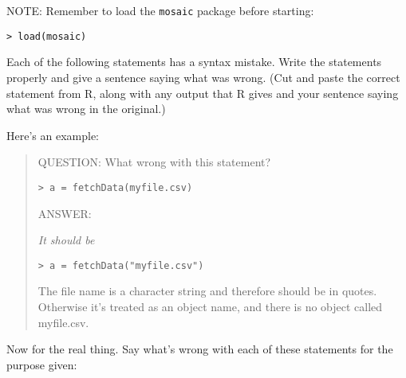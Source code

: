 
NOTE: Remember to load the \texttt{mosaic} package before starting:
\begin{verbatim}
> load(mosaic)
\end{verbatim}

\bigskip

Each of the following statements has a syntax mistake.  Write the
statements properly and give a sentence saying what was wrong. (Cut
and paste the correct statement from R, along with any output that R
gives and your sentence saying what was wrong in the original.)

\noindent Here's an example: 

\begin{quotation}
\noindent QUESTION: What wrong with this statement?
\begin{verbatim}
> a = fetchData(myfile.csv) 
\end{verbatim}

\noindent ANSWER: {\em It should be 
\begin{verbatim}
> a = fetchData("myfile.csv") 
\end{verbatim}
The file name is a character string and
therefore should be in quotes.  Otherwise it's treated as an object
name, and there is no object called myfile.csv.}
\end{quotation}

Now for the real thing.  Say what's wrong with each of these
statements for the purpose given:

